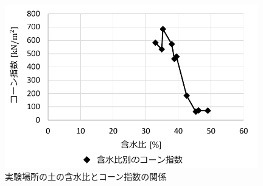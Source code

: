 \begin{figure}[b]
      \begin{center}
            \includegraphics[width=11cm]{./ch5_ConeIndexEstimation/Fig/coneindex_and_watercontent_relationship_of_experimental_site_compressed}
            \caption{実験場所の土の含水比とコーン指数の関係}
            \label{fig:coneindex_and_watercontent_relationship_of_experimental_site}
      \end{center}
\end{figure}

